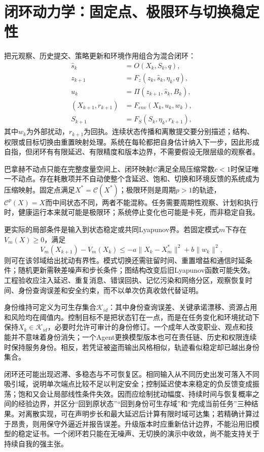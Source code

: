 \section{闭环动力学：固定点、极限环与切换稳定性}

把元观察、历史提交、策略更新和环境作用组合为混合闭环：
\begin{align}
\hat{s}_k&=O(X_k,S_k,q),\\
z_{k+1}&=F_z(z_k,\hat{s}_k,\eta_k,q),\\
u_k&=\Pi(z_{k+1},\hat{s}_k,B_k),\\
(X_{k+1},r_{k+1})&=F_{env}(X_k,u_k,w_k),\\
S_{k+1}&=F_S(S_k,\eta_k,r_{k+1}),
\end{align}
其中$w_k$为外部扰动，$r_{k+1}$为回执。连续状态传播和离散提交要分别描述；结构、权限或目标切换由重置映射处理。系统在每轮都把自身估计纳入下一步，因此形成自指，但闭环有有限延迟、有限精度和版本边界，不需要假设无限层级的观察者。

巴拿赫不动点只能在完整度量空间上、闭环映射$\mathcal{C}$满足全局压缩常数$c<1$时保证唯一不动点。存在耗散项并不自动使整个含延迟、饱和、切换和环境反馈的系统成为压缩映射。固定点满足$X^*=\mathcal{C}(X^*)$；极限环则是周期$p>1$的轨迹，$\mathcal{C}^p(X)=X$而中间状态不同，两者不能混称。任务需要周期性观察、计划和执行时，健康运行本来就可能是极限环；系统停止变化也可能是卡死，而非稳定自我。

更实际的局部条件是输入到状态稳定或共同Lyapunov界。若固定模式$m$下存在$V_m(X)\geq0$，满足
\begin{equation}
V_m(X_{k+1})-V_m(X_k)\leq-a\|X_k-X_m^*\|^2+b\|w_k\|^2,
\end{equation}
则可在该邻域给出扰动有界性。模式切换还需驻留时间、重置增益和通信时延条件；随机更新需鞅差噪声和步长条件；图结构改变后旧Lyapunov函数可能失效。工程验收应注入延迟、重复消息、错误回执、记忆污染和网络分区，观察恢复时间、身份查询误差和安全约束，而不以单次仿真收敛代替证明。

身份维持可定义为可生存集合$\mathcal{K}_{id}$：其中身份查询误差、关键承诺漂移、资源占用和风险均在阈值内。控制目标不是把状态钉在一点，而是在任务变化和环境扰动下保持$X_k\in\mathcal{K}_{id}$，必要时允许可审计的身份修订。一个成年人改变职业、观点和技能并不意味着身份消失；一个Agent更换模型版本也可在责任链、历史和权限连续时保持服务身份。相反，若凭证被盗而输出风格相似，轨迹看似稳定却已越出身份集合。

闭环还可能出现迟滞、多稳态与不可恢复区。相同输入从不同历史出发可落入不同吸引域，说明单次端点比较不足以判定安全；控制延迟使本来稳定的负反馈变成振荡；饱和又会让局部线性条件失效。因而应绘制扰动幅度、持续时间与恢复概率之间的经验边界，并区分“回到原状态”“回到身份可生存域”和“完成当前任务”三种结果。对离散实现，可在声明步长和最大延迟后计算有限时域可达集；若精确计算过于昂贵，则用保守外逼近并报告误差。升级版本时应重新估计边界，不能沿用旧模型的稳定证书。一个闭环若只能在无噪声、无切换的演示中收敛，尚不能支持关于持续自我的强主张。

